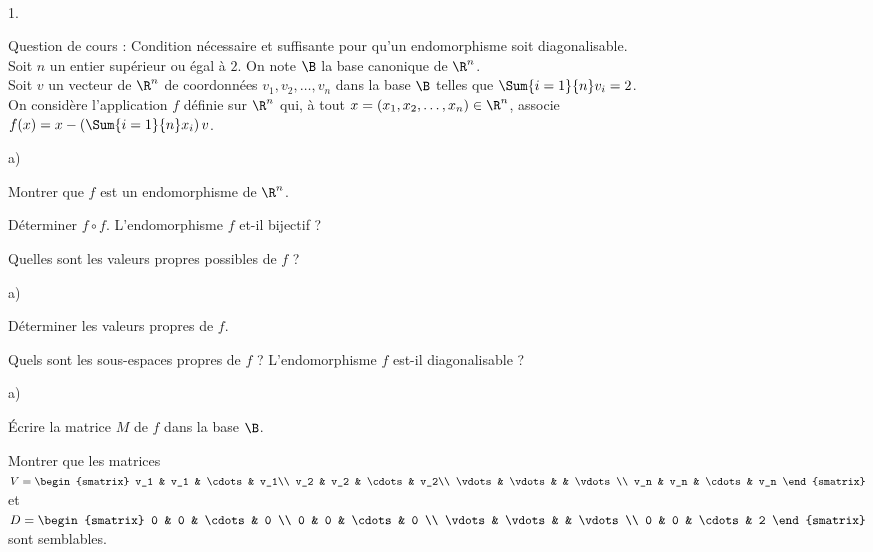 \documentclass[11pt]{article}%
\begin{document}
\begin{exerciceAP}~
  \begin{noliste}{1.}
    \setlength{\itemsep}{2mm}
  \item Question de cours : Condition nécessaire et suffisante pour
    qu'un endomorphisme soit diagonalisable.\\
    Soit $n$ un entier supérieur ou égal à $2$. On note $\B$ la base
    canonique de $\R^n$.\\
    Soit $v$ un vecteur de $\R^n$ de coordonnées $v_1,v_2,\hdots,v_n$
    dans la base $\B$ telles que $\Sum{i=1}{n} v_i=2$.\\
    On considère l'application $f$ définie sur $\R^n$ qui, à tout
    $x=(x_1,x_2,\hdots,x_n)\in\R^n$, associe\\
    $f(x)=x-\left(\Sum{i=1}{n} x_i\right)v$.

  \item
    \begin{noliste}{a)}
    \setlength{\itemsep}{2mm}
    \item Montrer que $f$ est un endomorphisme de $\R^n$.
    \item Déterminer $f \circ f$. L'endomorphisme $f$ et-il bijectif ?
    \item Quelles sont les valeurs propres possibles de $f$ ?
    \end{noliste}

  \item
    \begin{noliste}{a)}
    \setlength{\itemsep}{2mm}
    \item Déterminer les valeurs propres de $f$.
    \item Quels sont les sous-espaces propres de $f$ ? L'endomorphisme
      $f$ est-il diagonalisable ?
    \end{noliste}

  \item
    \begin{noliste}{a)}
    \setlength{\itemsep}{2mm}
    \item Écrire la matrice $M$ de $f$ dans la base $\B$.
    \item Montrer que les matrices $V =
      \begin{smatrix}
	v_1 & v_1 & \cdots & v_1\\
	v_2 & v_2 & \cdots & v_2\\
	\vdots & \vdots & & \vdots\\
	v_n & v_n & \cdots & v_n
      \end{smatrix}$ et $D = 
      \begin{smatrix}
        0 & 0 & \cdots & 0 \\
        0 & 0 & \cdots & 0 \\
        \vdots & \vdots & & \vdots\\
        0 & 0 & \cdots & 2
      \end{smatrix}$ sont semblables.
    \end{noliste}
  \end{noliste}
\end{exerciceAP}
\end{document}
